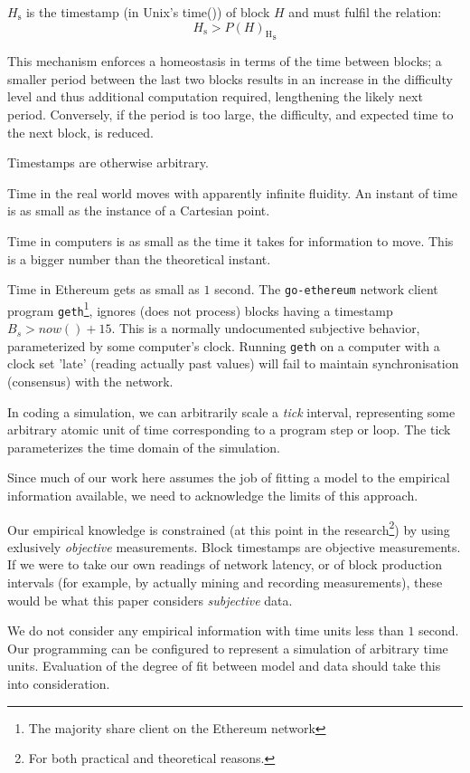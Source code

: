 \documentclass[11pt]{article}
\begin{document}
	\hypertarget{block_timestamp_H__s}{}$H_{\mathrm{s}}$ is the timestamp (in
	Unix's time()) of block $H$ and must fulfil the relation:
	\begin{equation}
		H_{\mathrm{s}} > {P(H)_{\mathrm{H}}}_{\mathrm{s}}
	\end{equation}

	This mechanism enforces a homeostasis in terms of the time between blocks; a
	smaller period between the last two blocks results in an increase in the
	difficulty level and thus additional computation required, lengthening the
	likely next period. Conversely, if the period is too large, the difficulty, and
	expected time to the next block, is reduced.

	Timestamps are otherwise arbitrary.

	Time in the real world moves with apparently infinite fluidity. An instant of
	time is as small as the instance of a Cartesian point.

	Time in computers is as small as the time it takes for information to move.
	This is a bigger number than the theoretical instant.

	Time in Ethereum gets as small as $1$ second.
	The \texttt{go-ethereum} network client program \texttt{geth}\footnote{The
	majority share client on the Ethereum network}, ignores (does not process)
	blocks having a timestamp $B_s > now() + 15$. This is a normally undocumented
	subjective behavior, parameterized by some computer's clock. Running
	\texttt{geth} on a computer with a clock set 'late' (reading actually past
	values) will fail to maintain synchronisation (consensus) with the network.

	In coding a simulation, we can arbitrarily scale a \textit{tick} interval,
	representing some arbitrary atomic unit of time corresponding to a program step
	or loop. The tick parameterizes the time domain of the simulation.

	Since much of our work here assumes the job of fitting a model to the empirical
	information available, we need to acknowledge the limits of this approach.

	Our empirical knowledge is constrained (at this point in the research\footnote{
		For both practical and theoretical reasons.}) by using exlusively \emph{
		objective} measurements. Block timestamps are objective measurements.
	If we were to take our own readings of network latency, or of block production
	intervals (for example, by actually mining and recording measurements), these
	would be what this paper considers \emph{subjective} data.

	We do not consider any empirical information with time units less than $1$
	second. Our programming can be configured to represent a simulation of
	arbitrary time units. Evaluation of the degree of fit between model and
	data should take this into consideration.
\end{document}
